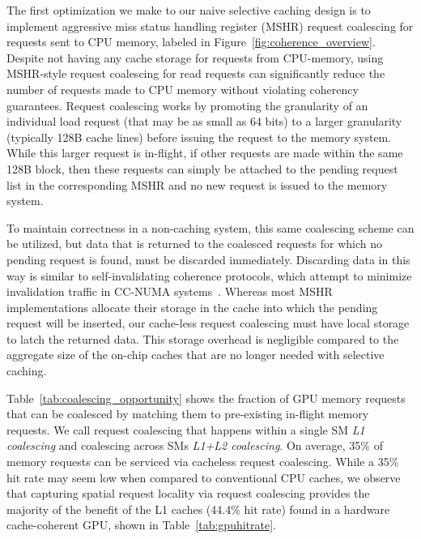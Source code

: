 The first optimization we make to our naive
selective caching design is to implement aggressive miss status handling register (MSHR)
request coalescing for requests sent to CPU memory, labeled  in Figure~\ref{fig:coherence_overview}.  
Despite not having any cache storage for
requests from CPU-memory, using MSHR-style request coalescing for
read requests can significantly reduce the number of
requests made to CPU memory without violating coherency guarantees.
Request coalescing works by promoting
the granularity of an individual load request (that may be as small as 64 bits)
to a larger granularity (typically 128B cache lines) before issuing the request
to the memory system.  While this larger request is in-flight, if other requests
are made within the same 128B block, then these requests
can simply be attached to the pending request list in the corresponding MSHR and no new request is issued
to the memory system.

To maintain correctness in a non-caching system, this same coalescing
scheme can be utilized, but data that is returned to the coalesced requests for which no pending
request is found, must be discarded immediately. Discarding data in this way is similar to self-invalidating
coherence protocols, which attempt to minimize invalidation traffic in CC-NUMA
systems~\cite{Lebeck95,Lai2000}.  Whereas most MSHR implementations allocate their storage in
the cache into which the pending request will be inserted, our cache-less request coalescing must have
local storage to latch the returned data.  This storage overhead is negligible compared to the aggregate
size of the on-chip caches that are no longer needed with selective caching.

Table~\ref{tab:coalescing_opportunity} shows the fraction of GPU memory requests 
that can be coalesced by matching them to pre-existing in-flight memory requests.
We call request coalescing that happens within a single 
SM \emph{L1 coalescing} and coalescing across SMs \emph{L1+L2 coalescing}.  
On average, 35\% of memory requests can be serviced via 
cacheless request coalescing.  While a 35\% hit rate may seem low when
compared to conventional CPU caches, we observe that capturing spatial request locality
via request coalescing provides the majority of the benefit of the L1 caches (44.4\% hit rate) found
in a hardware cache-coherent GPU, shown in Table~\ref{tab:gpuhitrate}.

